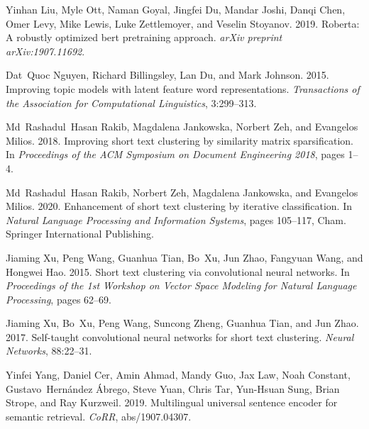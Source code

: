 \documentclass[11pt,a4paper]{article}
\begin{document}
\begin{thebibliography}{18}
Yinhan Liu, Myle Ott, Naman Goyal, Jingfei Du, Mandar Joshi, Danqi Chen, Omer
  Levy, Mike Lewis, Luke Zettlemoyer, and Veselin Stoyanov. 2019.
\newblock Roberta: A robustly optimized bert pretraining approach.
\newblock \emph{arXiv preprint arXiv:1907.11692}.

Dat~Quoc Nguyen, Richard Billingsley, Lan Du, and Mark Johnson. 2015.
\newblock Improving topic models with latent feature word representations.
\newblock \emph{Transactions of the Association for Computational Linguistics},
  3:299--313.

Md~Rashadul~Hasan Rakib, Magdalena Jankowska, Norbert Zeh, and Evangelos
  Milios. 2018.
\newblock Improving short text clustering by similarity matrix sparsification.
\newblock In \emph{Proceedings of the ACM Symposium on Document Engineering
  2018}, pages 1--4.

Md~Rashadul~Hasan Rakib, Norbert Zeh, Magdalena Jankowska, and Evangelos
  Milios. 2020.
\newblock Enhancement of short text clustering by iterative classification.
\newblock In \emph{Natural Language Processing and Information Systems}, pages
  105--117, Cham. Springer International Publishing.

Jiaming Xu, Peng Wang, Guanhua Tian, Bo~Xu, Jun Zhao, Fangyuan Wang, and
  Hongwei Hao. 2015.
\newblock Short text clustering via convolutional neural networks.
\newblock In \emph{Proceedings of the 1st Workshop on Vector Space Modeling for
  Natural Language Processing}, pages 62--69.

Jiaming Xu, Bo~Xu, Peng Wang, Suncong Zheng, Guanhua Tian, and Jun Zhao. 2017.
\newblock Self-taught convolutional neural networks for short text clustering.
\newblock \emph{Neural Networks}, 88:22--31.

Yinfei Yang, Daniel Cer, Amin Ahmad, Mandy Guo, Jax Law, Noah Constant,
  Gustavo~Hern{\'{a}}ndez {\'{A}}brego, Steve Yuan, Chris Tar, Yun{-}Hsuan
  Sung, Brian Strope, and Ray Kurzweil. 2019.
\newblock Multilingual universal
  sentence encoder for semantic retrieval.
\newblock \emph{CoRR}, abs/1907.04307.


\end{thebibliography}
\end{document}

